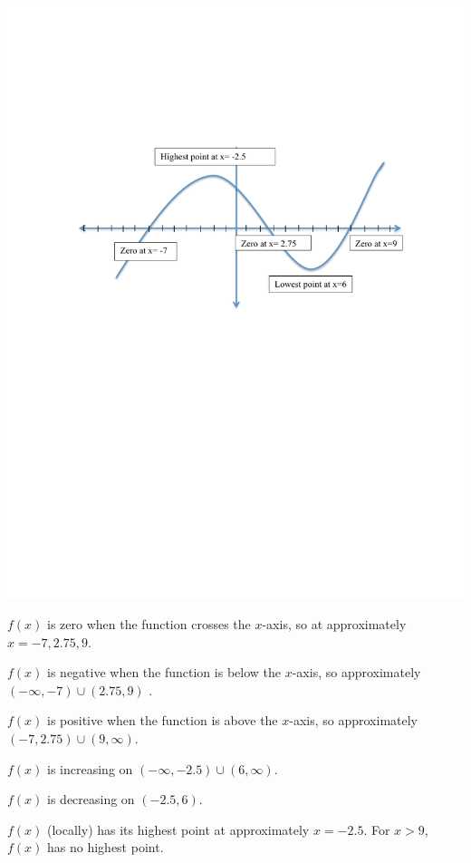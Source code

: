 \documentclass[nooutcomes]{ximera}
\begin{document}
\begin{problem}
		\begin{freeResponse}
			\begin{image}
			\includegraphics[trim= 250 410 250 160]{Figure3.pdf}
			\end{image}
			
			$f(x)$ is zero when the function crosses the $x$-axis, so at approximately $x=-7,2.75,9$. 
			
			$f(x)$ is negative when the function is below the $x$-axis, so approximately $(-\infty ,-7) \cup (2.75,9)$ .
			
			$f(x)$ is positive when the function is above the $x$-axis, so approximately $(-7,2.75) \cup (9,\infty )$. 
			
			$f(x)$ is increasing on $(-\infty ,-2.5) \cup (6,\infty )$. 
			
			$f(x)$ is decreasing on $(-2.5,6)$.
			
			$f(x)$ (locally) has its highest point at approximately $x=-2.5$.  For $x > 9$, $f(x)$ has no highest point.
			 

\end{freeResponse}
\end{problem}
\end{document}
